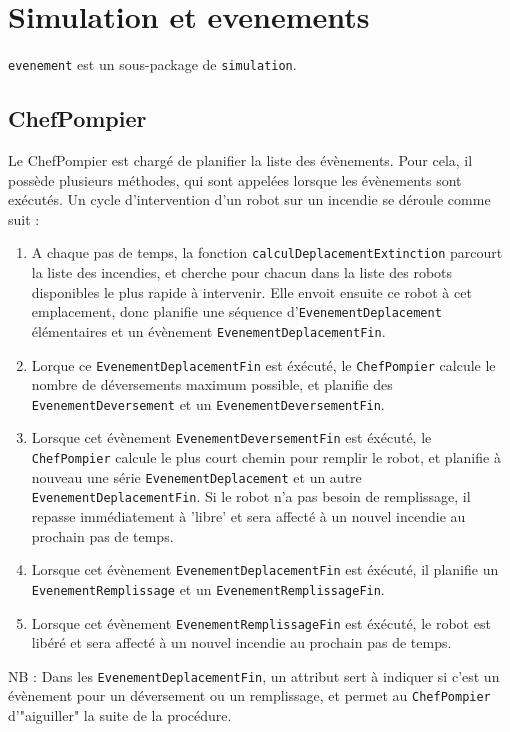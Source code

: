 \documentclass[12pt,a4paper]{article}
\begin{document}
\section{Simulation et evenements}

\verb?evenement? est un sous-package de \verb?simulation?.

\subsection{ChefPompier}

Le ChefPompier est chargé de planifier la liste des évènements. Pour cela, il possède plusieurs méthodes, qui sont appelées lorsque les évènements sont exécutés. Un cycle d'intervention d'un robot sur un incendie se déroule comme suit : 
\begin{enumerate}
	\item A chaque pas de temps, la fonction \verb?calculDeplacementExtinction? parcourt la liste des incendies, et cherche pour chacun dans la liste des robots disponibles le plus rapide à intervenir. Elle envoit ensuite ce robot à cet emplacement, donc planifie une séquence d'\verb?EvenementDeplacement? élémentaires et un évènement \verb?EvenementDeplacementFin?.
	\item Lorque ce \verb?EvenementDeplacementFin? est éxécuté, le \verb?ChefPompier? calcule le nombre de déversements maximum possible, et planifie des \verb?EvenementDeversement? et un \verb?EvenementDeversementFin?.
	\item Lorsque cet évènement \verb?EvenementDeversementFin? est éxécuté, le \verb?ChefPompier? calcule le plus court chemin pour remplir le robot, et planifie à nouveau une série \verb?EvenementDeplacement? et un autre \verb?EvenementDeplacementFin?. Si le robot n'a pas besoin de remplissage, il repasse immédiatement à 'libre' et sera affecté à un nouvel incendie au prochain pas de temps.
	\item Lorsque cet évènement \verb?EvenementDeplacementFin? est éxécuté, il planifie un \verb?EvenementRemplissage? et un \verb?EvenementRemplissageFin?.
	\item Lorsque cet évènement \verb?EvenementRemplissageFin? est éxécuté, le robot est libéré et sera affecté à un nouvel incendie au prochain pas de temps.
\end{enumerate}

NB : Dans les \verb?EvenementDeplacementFin?, un attribut sert à indiquer si c'est un évènement pour un déversement ou un remplissage, et permet au \verb?ChefPompier? d'"aiguiller" la suite de la procédure.
\end{document}
